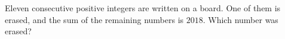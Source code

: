 Eleven consecutive positive integers are written on a board. One of them is erased, and the sum of the remaining numbers is $2018$. Which number was erased?

